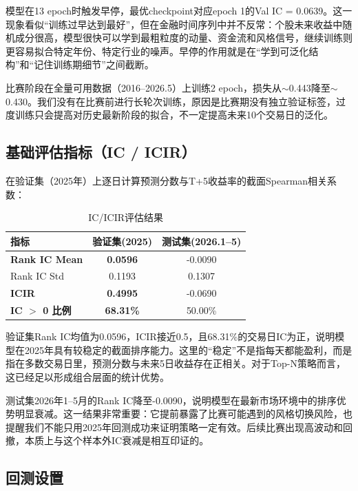 \documentclass[10pt,a4paper]{ctexart}
\begin{document}
模型在13 epoch时触发早停，最优checkpoint对应epoch 1的Val IC = 0.0639。这一现象看似“训练过早达到最好”，但在金融时间序列中并不反常：个股未来收益中随机成分很高，模型很快可以学到最粗粒度的动量、资金流和风格信号，继续训练则更容易拟合特定年份、特定行业的噪声。早停的作用就是在“学到可泛化结构”和“记住训练期细节”之间截断。

比赛阶段在全量可用数据（2016--2026.5）上训练2 epoch，损失从$\sim$0.443降至$\sim$0.430。我们没有在比赛前进行长轮次训练，原因是比赛期没有独立验证标签，过度训练只会提高对历史最新阶段的拟合，不一定提高未来10个交易日的泛化。

\subsection{基础评估指标（IC / ICIR）}

在验证集（2025年）上逐日计算预测分数与T+5收益率的截面Spearman相关系数：

\begin{table}[htbp]
    \centering
    \caption{IC/ICIR评估结果}
    \begin{tabular}{lcc}
        \toprule
        指标 & 验证集(2025) & 测试集(2026.1--5) \\
        \midrule
        \textbf{Rank IC Mean} & \textbf{0.0596} & -0.0090 \\
        Rank IC Std & 0.1193 & 0.1307 \\
        \textbf{ICIR} & \textbf{0.4995} & -0.0690 \\
        \textbf{IC $>$ 0 比例} & \textbf{68.31\%} & 50.00\% \\
        \bottomrule
    \end{tabular}
\end{table}

验证集Rank IC均值为0.0596，ICIR接近0.5，且68.31\%的交易日IC为正，说明模型在2025年具有较稳定的截面排序能力。这里的“稳定”不是指每天都能盈利，而是指在多数交易日里，预测分数与未来5日收益存在正相关。对于Top-N策略而言，这已经足以形成组合层面的统计优势。

测试集2026年1--5月的Rank IC降至-0.0090，说明模型在最新市场环境中的排序优势明显衰减。这一结果非常重要：它提前暴露了比赛可能遇到的风格切换风险，也提醒我们不能只用2025年回测成功来证明策略一定有效。后续比赛出现高波动和回撤，本质上与这个样本外IC衰减是相互印证的。

\subsection{回测设置}
\end{document}
